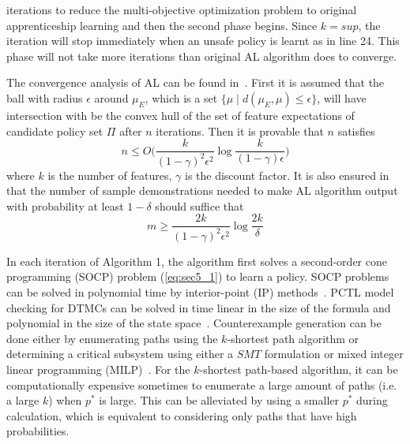 \noindent iterations to reduce the multi-objective optimization problem to original apprenticeship learning and then the second phase begins. Since $k=sup$, the iteration will stop immediately when an unsafe policy is learnt as in line 24. This phase will not take more iterations than original AL algorithm does to converge.

The convergence analysis of AL can be found in~\cite{Abbeel:2004:ALV:1015330.1015430}. First it is assumed that the ball with radius $\epsilon$ around $\mu_E$, which is a set $\{\mu\mid d(\mu_E, \mu)\leq\epsilon\}$, will have intersection with be the convex hull of the set of feature expectations of candidate policy set $\Pi$ after $n$ iterations. Then it is provable that $n$ satisfies
\begin{equation}
n\leq O\big(\frac{k}{(1-\gamma)^2\epsilon^2}\log{\frac{k}{(1-\gamma)\epsilon}}\big)
\end{equation}
where $k$ is the number of features, $\gamma$ is the discount factor. It is also ensured in~\cite{Abbeel:2004:ALV:1015330.1015430} that the number of sample demonstrations needed to make AL algorithm output with probability at least $1-\delta$ should suffice that
\begin{equation}
m\geq \frac{2k}{(1-\gamma)^2\epsilon^2}\log{\frac{2k}{\delta}}
\end{equation}

In each iteration of Algorithm 1, the algorithm first solves a second-order cone programming (SOCP) problem (\ref{eq:sec5_1}) to learn a policy. SOCP problems can be solved in polynomial time by interior-point (IP) methods~\cite{Kuo:2004aa}.
PCTL model checking for DTMCs can be solved in time linear in the size of the formula and polynomial in the size of the state space~\cite{Hansson1994}. 
Counterexample generation can be done either by enumerating paths using the $k$-shortest path algorithm or determining a critical subsystem using either a $SMT$ formulation or mixed integer linear programming (MILP)~\cite{Wimmer2012}. For the $k$-shortest path-based algorithm, it can be computationally expensive sometimes to enumerate a large amount of paths (i.e. a large $k$) when $p^*$ is large. This can be alleviated by using a smaller $p^*$ during calculation, which is equivalent to considering only paths that have high probabilities.
